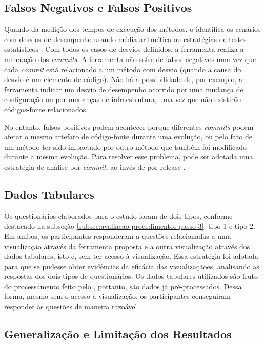 \subsection{Falsos Negativos e Falsos Positivos}

Quando da medição dos tempos de execução dos métodos, o \textit{\perfMinerName} identifica os cenários com desvios de desempenho usando média aritmética ou estratégias de testes estatísticos \cite{Pinto2015}. Com todos os casos de desvios definidos, a ferramenta realiza a mineração dos \textit{commits}. A ferramenta não sofre de falsos negativos uma vez que cada \textit{commit} está relacionado a um método com desvio (quando a causa do desvio é um elemento de código). Não há a possibilidade de, por exemplo, a ferramenta indicar um desvio de desempenho ocorrido por uma mudança de configuração ou por mudanças de infraestrutura, uma vez que não existirão códigos-fonte relacionados.

No entanto, falsos positivos podem acontecer porque diferentes \textit{commits} podem afetar o mesmo artefato de código-fonte durante uma evolução, ou pelo fato de um método ter sido impactado por outro método que também foi modificado durante a mesma evolução. Para resolver esse problema, pode ser adotada uma estratégia de análise por \textit{commit}, ao invés de por release \cite{Pinto2015}.

\subsection{Dados Tabulares}

Os questionários elaborados para o estudo foram de dois tipos, conforme destacado na subseção \ref{subsec:avaliacao-procedimentos-passo-3}: tipo 1 e tipo 2. Em ambos, os participantes responderam a questões relacionadas a uma visualização através da ferramenta proposta e a outra visualização através dos dados tabulares, isto é, sem ter acesso à visualização. Essa estratégia foi adotada para que se pudesse obter evidências da eficácia das visualizaçãoes, analisando as respostas dos dois tipos de questionários. Os dados tabulares utilizados são fruto do processamento feito pelo \textit{\perfMinerName}, portanto, são dados já pré-processados. Dessa forma, mesmo sem o acesso à visualização, os participantes conseguiram responder às questões de maneira razoável.

\subsection{Generalização e Limitação dos Resultados}

